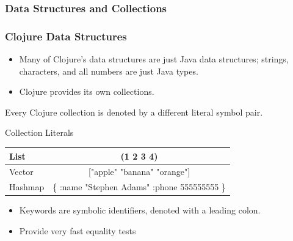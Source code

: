 \documentclass[xcolor=dvipsnames]{beamer}
\begin{document}
		\subsubsection{Data Structures and Collections}	
		\begin{frame}[fragile]
		\frametitle{Clojure Data Structures}
			\begin{itemize}			
			\item Many of Clojure's data structures are just Java data structures; strings, characters, and all numbers are just Java types.
			\pause
			\item Clojure provides its own collections.
			\end{itemize}
		\end{frame}
		\begin{frame}
		Every Clojure collection is denoted by a different literal symbol pair.
			\begin{block}{Collection Literals}
				\begin{table}[H]
				\begin{tabular}{ | l | c | }
				\hline
				List & (1 2 3 4) \\ \hline
				Vector & ["apple" "banana" "orange"] \\ \hline
				Hashmap & \{ :name "Stephen Adams" :phone 555555555 \} \\ \hline
				\end{tabular}
				\end{table}
			\end{block}
			\begin{itemize}
			\item Keywords are symbolic identifiers, denoted with a leading colon.
			\item Provide very fast equality tests
			\end{itemize}

		\end{frame}
		
		
\end{document}
